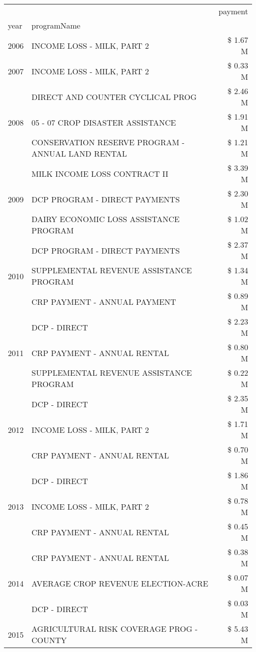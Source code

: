 \begin{tabular}{llr}
\toprule
 &  & payment \\
year & programName &  \\
\midrule
2006 & INCOME LOSS - MILK, PART 2 & \$ 1.67 M \\
\cline{1-3}
2007 & INCOME LOSS - MILK, PART 2 & \$ 0.33 M \\
\cline{1-3}
\multirow[t]{3}{*}{2008} & DIRECT AND COUNTER CYCLICAL PROG & \$ 2.46 M \\
 & 05 - 07 CROP DISASTER ASSISTANCE & \$ 1.91 M \\
 & CONSERVATION RESERVE PROGRAM - ANNUAL LAND RENTAL & \$ 1.21 M \\
\cline{1-3}
\multirow[t]{3}{*}{2009} & MILK INCOME LOSS CONTRACT II & \$ 3.39 M \\
 & DCP PROGRAM - DIRECT PAYMENTS & \$ 2.30 M \\
 & DAIRY ECONOMIC LOSS ASSISTANCE PROGRAM & \$ 1.02 M \\
\cline{1-3}
\multirow[t]{3}{*}{2010} & DCP PROGRAM - DIRECT PAYMENTS & \$ 2.37 M \\
 & SUPPLEMENTAL REVENUE ASSISTANCE PROGRAM & \$ 1.34 M \\
 & CRP PAYMENT - ANNUAL PAYMENT & \$ 0.89 M \\
\cline{1-3}
\multirow[t]{3}{*}{2011} & DCP - DIRECT & \$ 2.23 M \\
 & CRP PAYMENT - ANNUAL RENTAL & \$ 0.80 M \\
 & SUPPLEMENTAL REVENUE ASSISTANCE PROGRAM & \$ 0.22 M \\
\cline{1-3}
\multirow[t]{3}{*}{2012} & DCP - DIRECT & \$ 2.35 M \\
 & INCOME LOSS - MILK, PART 2 & \$ 1.71 M \\
 & CRP PAYMENT - ANNUAL RENTAL & \$ 0.70 M \\
\cline{1-3}
\multirow[t]{3}{*}{2013} & DCP - DIRECT & \$ 1.86 M \\
 & INCOME LOSS - MILK, PART 2 & \$ 0.78 M \\
 & CRP PAYMENT - ANNUAL RENTAL & \$ 0.45 M \\
\cline{1-3}
\multirow[t]{3}{*}{2014} & CRP PAYMENT - ANNUAL RENTAL & \$ 0.38 M \\
 & AVERAGE CROP REVENUE ELECTION-ACRE & \$ 0.07 M \\
 & DCP - DIRECT & \$ 0.03 M \\
\cline{1-3}
\multirow[t]{3}{*}{2015} & AGRICULTURAL RISK COVERAGE PROG - COUNTY & \$ 5.43 M \\

\end{tabular}
